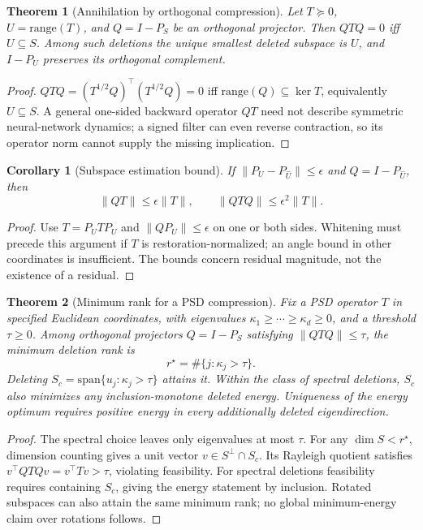 \documentclass{article}
\newtheorem{theorem}{Theorem}
\newtheorem{corollary}{Corollary}
\begin{document}
\begin{theorem}[Annihilation by orthogonal compression]\label{thm:filters}
Let $T\succeq0$, $U=\mathrm{range}(T)$, and $Q=I-P_S$ be an orthogonal projector. Then $QTQ=0$ iff $U\subseteq S$. Among such deletions the unique smallest deleted subspace is $U$, and $I-P_U$ preserves its orthogonal complement.
\end{theorem}
\begin{proof}
$QTQ=(T^{1/2}Q)^\top(T^{1/2}Q)=0$ iff $\mathrm{range}(Q)\subseteq\ker T$, equivalently $U\subseteq S$. A general one-sided backward operator $QT$ need not describe symmetric neural-network dynamics; a signed filter can even reverse contraction, so its operator norm cannot supply the missing implication.
\end{proof}

\begin{corollary}[Subspace estimation bound]\label{cor:estimation}
If $\|P_U-P_{\hat U}\|\le\epsilon$ and $Q=I-P_{\hat U}$, then
\begin{equation}
\|QT\|\le\epsilon\|T\|,\qquad \|QTQ\|\le\epsilon^2\|T\|.
\label{eq:estimation}
\end{equation}
\end{corollary}
\begin{proof}
Use $T=P_UTP_U$ and $\|QP_U\|\le\epsilon$ on one or both sides. Whitening must precede this argument if $T$ is restoration-normalized; an angle bound in other coordinates is insufficient. The bounds concern residual magnitude, not the existence of a residual.
\end{proof}

\begin{theorem}[Minimum rank for a PSD compression]\label{thm:minimalrank}
Fix a PSD operator $T$ in specified Euclidean coordinates, with eigenvalues $\kappa_1\ge\cdots\ge\kappa_d\ge0$, and a threshold $\tau\ge0$. Among orthogonal projectors $Q=I-P_S$ satisfying $\|QTQ\|\le\tau$, the minimum deletion rank is
\[
r^\star=\#\{j:\kappa_j>\tau\}.
\]
Deleting $S_c=\mathrm{span}\{u_j:\kappa_j>\tau\}$ attains it. Within the class of spectral deletions, $S_c$ also minimizes any inclusion-monotone deleted energy. Uniqueness of the energy optimum requires positive energy in every additionally deleted eigendirection.
\end{theorem}
\begin{proof}
The spectral choice leaves only eigenvalues at most $\tau$. For any $\dim S<r^\star$, dimension counting gives a unit vector $v\in S^\perp\cap S_c$. Its Rayleigh quotient satisfies $v^\top QTQv=v^\top Tv>\tau$, violating feasibility. For spectral deletions feasibility requires containing $S_c$, giving the energy statement by inclusion. Rotated subspaces can also attain the same minimum rank; no global minimum-energy claim over rotations follows.
\end{proof}
\end{document}

